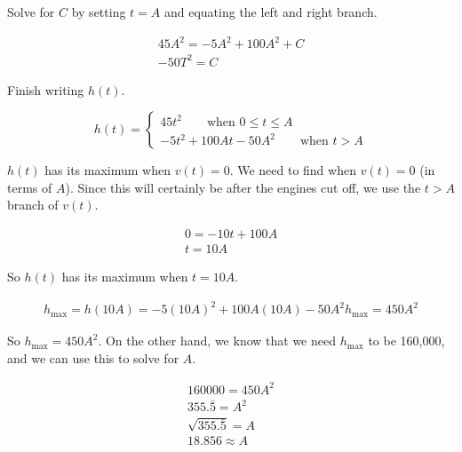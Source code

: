 \documentclass{letter}
\begin{document}
\begin{problem}{}
{      Solve for $C$ by setting $t = A$
      and equating the left and right branch.

      \begin{gather*}
        45A^2 = -5A^2 + 100A^2 + C \\
        -50T^2 = C
      \end{gather*}

      Finish writing $h(t)$.

      \[
        h(t) = \begin{cases}
          45t^2 \qquad\text{when } 0 \leq t \leq A \\
          -5t^2 + 100At -50A^2 \qquad\text{when } t > A
        \end{cases}
      \]

      $h(t)$ has its maximum when $v(t) = 0$.
      We need to find when $v(t) = 0$ (in terms of $A$).
      Since this will certainly be after the engines cut off,
      we use the $t > A$ branch of $v(t)$.

      \begin{gather*}
        0 = -10t + 100A \\
        t = 10A
      \end{gather*}

      So $h(t)$ has its maximum when $t = 10A$.

      \begin{gather*}
        h_\text{max} = h(10A) = -5(10A)^2 + 100A(10A) -50A^2
        h_\text{max} = 450A^2
      \end{gather*}

      So $h_\text{max} = 450A^2$. On the other hand, we know that we
      need $h_\text{max}$ to be 160,000, and we can use this to solve
      for $A$.

      \begin{gather*}
        160000 = 450A^2 \\
        355.\bar{5} = A^2 \\
        \sqrt{355.\bar{5}} = A \\
        18.856 \approx A
      \end{gather*}
    }
  \end{problem}
\end{document}
